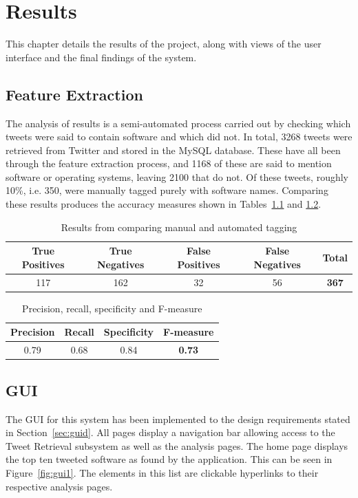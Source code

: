 \chapter{Results}
\label{cha:results}
This chapter details the results of the project, along with views of the user interface and the final findings of the system.

\section{Feature Extraction}
The analysis of results is a semi-automated process carried out by checking which tweets were said to contain software and which did not. In total, 3268 tweets were retrieved from Twitter and stored in the MySQL database. These have all been through the feature extraction process, and 1168 of these are said to mention software or operating systems, leaving 2100 that do not. Of these tweets, roughly 10\%, i.e. 350, were manually tagged purely with software names. Comparing these results produces the accuracy measures shown in Tables~\ref{tbl:truefalse} and \ref{tbl:measures}.

\begin{table}[h]
\begin{center}
\begin{tabular}{|c|c|c|c|c|}\hline
True Positives&True Negatives&False Positives&False Negatives&\textbf{Total}\\\hline
117&162&32&56&\textbf{367}\\\hline
\end{tabular}
\end{center}
\caption{Results from comparing manual and automated tagging}
\label{tbl:truefalse}
\end{table}

\begin{table}[h]
\begin{center}
\begin{tabular}{|c|c|c|c|}\hline
Precision&Recall&Specificity&\textbf{F-measure}\\\hline
0.79&0.68&0.84&\textbf{0.73}\\\hline
\end{tabular}
\end{center}
\caption{Precision, recall, specificity and F-measure}
\label{tbl:measures}
\end{table}

\section{GUI}
The GUI for this system has been implemented to the design requirements stated in Section~\ref{sec:guid}. All pages display a navigation bar allowing access to the Tweet Retrieval subsystem as well as the analysis pages. The home page displays the top ten tweeted software as found by the application. This can be seen in Figure~\ref{fig:gui1}. The elements in this list are clickable hyperlinks to their respective analysis pages.

